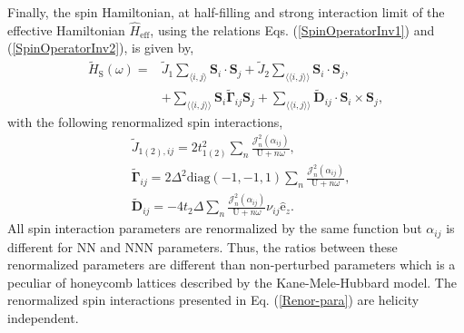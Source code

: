 \documentclass[aps,prl,twocolumn,amsmath,amssymb,nobibnotes]{revtex4-1}%
\newcommand{\n}{\nonumber}
\newcommand{\bs}{\boldsymbol}
\begin{document}
Finally, the spin Hamiltonian, at half-filling and strong interaction limit of the effective Hamiltonian $\hat{H}_{\text{eff}}$, using the relations Eqs. (\ref{SpinOperatorInv1}) and (\ref{SpinOperatorInv2}), is given by,
\begin{align}
\label{MKMHeffw}
\tilde{H}_{\text{S}}(\omega) =& \tilde{J}_{1}\sum_{\langle i,j \rangle} \bs{S}_i\cdot\bs{S}_j + \tilde{J}_{2}\sum_{\langle \langle i,j \rangle \rangle} \bs{S}_i\cdot\bs{S}_j, \n \\
&+ \sum_{\langle \langle i,j \rangle \rangle} \bs{S}_i \tilde{\bs{\Gamma}}_{ij} \bs{S}_j +\sum_{\langle \langle i,j \rangle \rangle} \tilde{\bs{D}}_{ij}\cdot \bs{S}_i \times \bs{S}_j,
\end{align}
with the following renormalized spin interactions,
\begin{subequations}
\label{Renor-para}
\begin{align}
&\tilde{J}_{1(2),ij} = 2t_{1(2)}^2\sum_n\frac{\mathcal{J}_{n}^2(\alpha_{ij})}{\text{U}+n\omega}, \\
&\tilde{\bs{\Gamma}}_{ij} = 2\Delta^2 \text{diag}(-1,-1,1) \sum_n\frac{\mathcal{J}_{n}^2(\alpha_{ij})}{\text{U}+n\omega},\\
&\tilde{\bs{D}}_{ij} = - 4 t_2 \Delta \sum_n\frac{\mathcal{J}_{n}^2(\alpha_{ij})}{\text{U}+n\omega} \nu_{ij} \hat{\mathrm{e}}_z.
\end{align}
\end{subequations}
All spin interaction parameters are renormalized by the same function but $\alpha_{ij}$ is different for NN and NNN parameters. Thus, the ratios between these renormalized parameters are different than non-perturbed parameters which is a peculiar of honeycomb lattices described by the Kane-Mele-Hubbard model. The renormalized spin interactions presented in Eq. (\ref{Renor-para}) are helicity independent.
\end{document}
